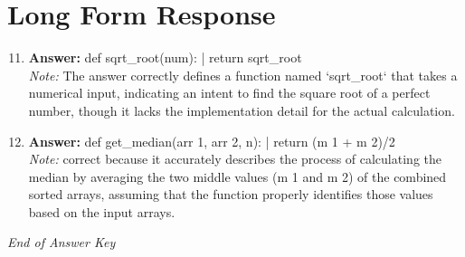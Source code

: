 \documentclass[12pt]{article}
\begin{document}
\section*{Long Form Response}
\begin{enumerate}[label=\arabic*.]
\setcounter{enumi}{10}
\item \textbf{Answer:} def sqrt\_root(num): | return sqrt\_root
\\ \textit{Note:} The answer correctly defines a function named `sqrt\_root` that takes a numerical input, indicating an intent to find the square root of a perfect number, though it lacks the implementation detail for the actual calculation.
\item \textbf{Answer:} def get\_median(arr 1, arr 2, n): | return (m 1 + m 2)/2
\\ \textit{Note:} correct because it accurately describes the process of calculating the median by averaging the two middle values (m 1 and m 2) of the combined sorted arrays, assuming that the function properly identifies those values based on the input arrays.
\end{enumerate}

\vfill
\noindent\textit{End of Answer Key}
\end{document}

